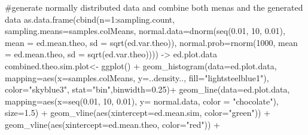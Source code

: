 \documentclass[]{article}
\newenvironment{Shaded}{}{}
\newcommand{\KeywordTok}[1]{\textcolor[rgb]{0.00,0.00,1.00}{{#1}}}
\newcommand{\DataTypeTok}[1]{{#1}}
\newcommand{\DecValTok}[1]{{#1}}
\newcommand{\FloatTok}[1]{{#1}}
\newcommand{\StringTok}[1]{\textcolor[rgb]{0.00,0.50,0.50}{{#1}}}
\newcommand{\CommentTok}[1]{\textcolor[rgb]{0.00,0.50,0.00}{{#1}}}
\newcommand{\NormalTok}[1]{{#1}}
\begin{document}
\begin{Shaded}
\begin{Highlighting}[]
\CommentTok{#generate normally distributed data and combine both menas and the generated data}
\KeywordTok{as.data.frame}\NormalTok{(}\KeywordTok{cbind}\NormalTok{(}\DataTypeTok{n=}\DecValTok{1}\NormalTok{:sampling.count, }\DataTypeTok{sampling.means=}\NormalTok{samples.colMeans, }
                    \DataTypeTok{normal.data=}\KeywordTok{dnorm}\NormalTok{(}\KeywordTok{seq}\NormalTok{(}\FloatTok{0.01}\NormalTok{, }\DecValTok{10}\NormalTok{, }\FloatTok{0.01}\NormalTok{), }
                                      \DataTypeTok{mean =} \NormalTok{ed.mean.theo, }
                                      \DataTypeTok{sd =} \KeywordTok{sqrt}\NormalTok{(ed.var.theo)),}
                    \DataTypeTok{normal.prob=}\KeywordTok{rnorm}\NormalTok{(}\DecValTok{1000}\NormalTok{, }
                                      \DataTypeTok{mean =} \NormalTok{ed.mean.theo, }
                                      \DataTypeTok{sd =} \KeywordTok{sqrt}\NormalTok{(ed.var.theo)))) ->}\StringTok{ }\NormalTok{ed.plot.data}
\NormalTok{combined.theo.sim.plot<-}\StringTok{ }\KeywordTok{ggplot}\NormalTok{() +}\StringTok{  }
\StringTok{        }\KeywordTok{geom_histogram}\NormalTok{(}\DataTypeTok{data=}\NormalTok{ed.plot.data, }
                       \DataTypeTok{mapping=}\KeywordTok{aes}\NormalTok{(}\DataTypeTok{x=}\NormalTok{samples.colMeans, }
                                   \DataTypeTok{y=}\NormalTok{..density..,}
                                   \DataTypeTok{fill=}\StringTok{"lightsteelblue1"}\NormalTok{),}
                       \DataTypeTok{color=}\StringTok{"skyblue3"}\NormalTok{, }
                       \DataTypeTok{stat=}\StringTok{"bin"}\NormalTok{,}\DataTypeTok{binwidth=}\FloatTok{0.25}\NormalTok{)+}
\StringTok{        }\KeywordTok{geom_line}\NormalTok{(}\DataTypeTok{data=}\NormalTok{ed.plot.data, }\DataTypeTok{mapping=}\KeywordTok{aes}\NormalTok{(}\DataTypeTok{x=}\KeywordTok{seq}\NormalTok{(}\FloatTok{0.01}\NormalTok{, }\DecValTok{10}\NormalTok{, }\FloatTok{0.01}\NormalTok{),}
                                                 \DataTypeTok{y=} \NormalTok{normal.data,}
                                                 \DataTypeTok{color =} \StringTok{"chocolate"}\NormalTok{), }
                  \DataTypeTok{size=}\FloatTok{1.5}\NormalTok{) +}\StringTok{ }
\StringTok{        }\KeywordTok{geom_vline}\NormalTok{(}\KeywordTok{aes}\NormalTok{(}\DataTypeTok{xintercept=}\NormalTok{ed.mean.sim, }\DataTypeTok{color=}\StringTok{"green"}\NormalTok{)) +}
\StringTok{        }\KeywordTok{geom_vline}\NormalTok{(}\KeywordTok{aes}\NormalTok{(}\DataTypeTok{xintercept=}\NormalTok{ed.mean.theo, }\DataTypeTok{color=}\StringTok{"red"}\NormalTok{)) +}

\end{Highlighting}
\end{Shaded}
\end{document}

